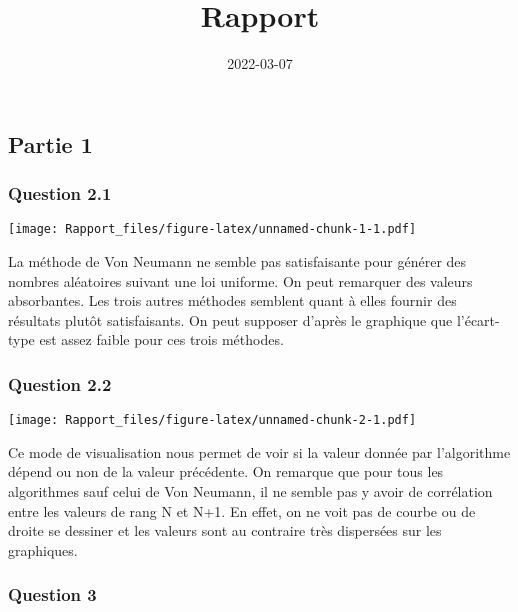 \documentclass[
]{article}
\title{Rapport}
\author{}
\date{\vspace{-2.5em}2022-03-07}
\begin{document}
\maketitle

\hypertarget{partie-1}{%
\subsection{Partie 1}\label{partie-1}}

\hypertarget{question-2.1}{%
\subsubsection{Question 2.1}\label{question-2.1}}

\texttt{[image: Rapport\_files/figure-latex/unnamed-chunk-1-1.pdf]}

La méthode de Von Neumann ne semble pas satisfaisante pour générer des
nombres aléatoires suivant une loi uniforme. On peut remarquer des
valeurs absorbantes. Les trois autres méthodes semblent quant à elles
fournir des résultats plutôt satisfaisants. On peut supposer d'après le
graphique que l'écart-type est assez faible pour ces trois méthodes.

\hypertarget{question-2.2}{%
\subsubsection{Question 2.2}\label{question-2.2}}

\texttt{[image: Rapport\_files/figure-latex/unnamed-chunk-2-1.pdf]}

Ce mode de visualisation nous permet de voir si la valeur donnée par
l'algorithme dépend ou non de la valeur précédente. On remarque que pour
tous les algorithmes sauf celui de Von Neumann, il ne semble pas y avoir
de corrélation entre les valeurs de rang N et N+1. En effet, on ne voit
pas de courbe ou de droite se dessiner et les valeurs sont au contraire
très dispersées sur les graphiques.

\hypertarget{question-3}{%
\subsubsection{Question 3}\label{question-3}}
\end{document}

